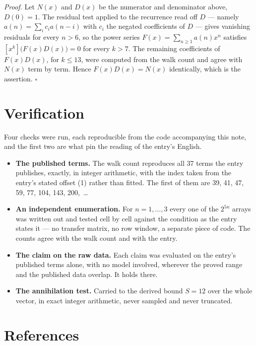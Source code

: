 \documentclass[11pt]{article}
\theoremstyle{definition}
\begin{document}
{\itshape Proof.} Let $N(x)$ and $D(x)$ be the numerator and denominator above, $D(0)=1$. The residual test applied to the recurrence read off $D$ --- namely $a(n) = \sum_i c_i a(n-i)$ with $c_i$ the negated coefficients of $D$ --- gives vanishing residuals for every $n > 6$, so the power series $F(x)=\sum_{n\ge 1}a(n)x^n$ satisfies $[x^k]\bigl(F(x)D(x)\bigr) = 0$ for every $k > 7$. The remaining coefficients of $F(x)D(x)$, for $k \le 13$, were computed from the walk count and agree with $N(x)$ term by term. Hence $F(x)D(x) = N(x)$ identically, which is the assertion. $\square$

\section{Verification}

Four checks were run, each reproducible from the code accompanying this note, and the first two are what pin the reading of the entry's English.

\begin{itemize}

\item {\bfseries The published terms.} The walk count reproduces all 37 terms the entry publishes, exactly, in integer arithmetic, with the index taken from the entry's stated offset (1) rather than fitted. The first of them are 39, 41, 47, 59, 77, 104, 143, 200,~\dots

\item {\bfseries An independent enumeration.} For $n = 1,\dots,3$ every one of the $2^{5n}$ arrays was written out and tested cell by cell against the condition as the entry states it --- no transfer matrix, no row window, a separate piece of code. The counts agree with the walk count and with the entry.

\item {\bfseries The claim on the raw data.} Each claim was evaluated on the entry's published terms alone, with no model involved, wherever the proved range and the published data overlap. It holds there.

\item {\bfseries The annihilation test.} Carried to the derived bound $S = 12$ over the whole vector, in exact integer arithmetic, never sampled and never truncated.

\end{itemize}

\section{References}
\end{document}
